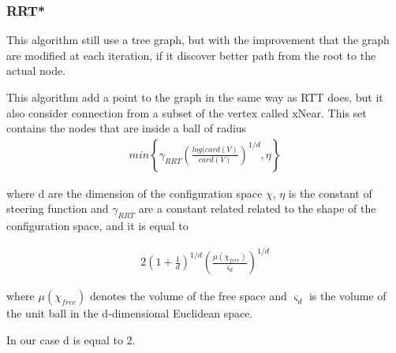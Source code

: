 \documentclass[10pt]{article}
\begin{document}
	\subsubsection{RRT*}
	
	This algorithm still use a tree graph, but with the improvement that the graph are modified at each iteration, if it discover better path from the root to the actual node.
	
	This algorithm add a point to the graph in the same way as RTT does, but it also consider connection from a subset of the vertex called xNear. This set contains the nodes that are inside a ball of radius 
	\begin{align}
		 min\left\{\gamma_{RRT}\left(\frac{log(card(V)}{card(V)}\right)^{1/d},\eta\right\}
		\nonumber
	\end{align}
	
	where d are the dimension of the configuration space $\chi$, $\eta$ is the constant of steering function and $\gamma_{RRT}$ are a constant related related to the shape of the configuration space, and it is equal to
	
	\begin{align}
	2\left(1+\frac{1}{d}\right)^{1/d} \left(\frac{\mu(\chi_{free})}{\varsigma_{d}}\right)^{1/d}
	\nonumber
	\end{align}
	
	where  $\mu(\chi_{free})$ denotes the volume of the free space and $\varsigma_{d}$ is the volume of the unit ball in the d-dimensional 	Euclidean space.
	
	In our case d is equal to 2.
	
\end{document}

